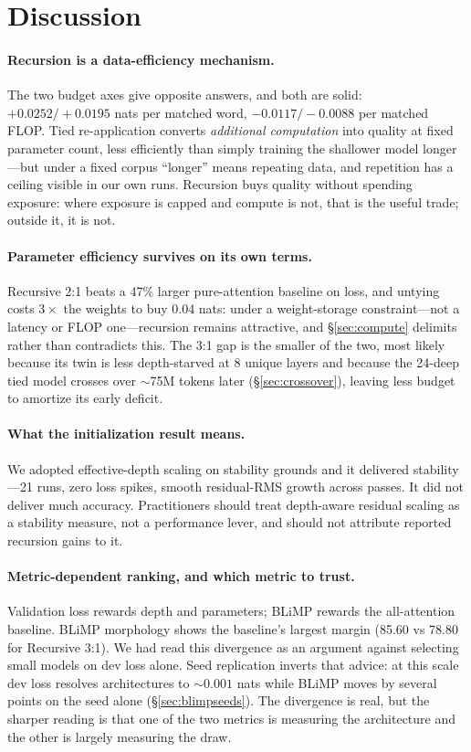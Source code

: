 \documentclass[11pt]{article}
\begin{document}
\section{Discussion}

\paragraph{Recursion is a data-efficiency mechanism.} The two budget axes give opposite answers, and both are solid: $+0.0252/+0.0195$ nats per matched word, $-0.0117/-0.0088$ per matched FLOP. Tied re-application converts \emph{additional computation} into quality at fixed parameter count, less efficiently than simply training the shallower model longer---but under a fixed corpus ``longer'' means repeating data, and repetition has a ceiling visible in our own runs. Recursion buys quality without spending exposure: where exposure is capped and compute is not, that is the useful trade; outside it, it is not.

\paragraph{Parameter efficiency survives on its own terms.} Recursive 2:1 beats a 47\% larger pure-attention baseline on loss, and untying costs $3\times$ the weights to buy 0.04 nats: under a weight-storage constraint---not a latency or FLOP one---recursion remains attractive, and \S\ref{sec:compute} delimits rather than contradicts this. The 3:1 gap is the smaller of the two, most likely because its twin is less depth-starved at 8 unique layers and because the 24-deep tied model crosses over ${\sim}$75M tokens later (\S\ref{sec:crossover}), leaving less budget to amortize its early deficit.

\paragraph{What the initialization result means.} We adopted effective-depth scaling on stability grounds and it delivered stability---21 runs, zero loss spikes, smooth residual-RMS growth across passes. It did not deliver much accuracy. Practitioners should treat depth-aware residual scaling as a stability measure, not a performance lever, and should not attribute reported recursion gains to it.

\paragraph{Metric-dependent ranking, and which metric to trust.} Validation loss rewards depth and parameters; BLiMP rewards the all-attention baseline. BLiMP morphology shows the baseline's largest margin (85.60 vs 78.80 for Recursive 3:1). We had read this divergence as an argument against selecting small models on dev loss alone. Seed replication inverts that advice: at this scale dev loss resolves architectures to ${\sim}0.001$ nats while BLiMP moves by several points on the seed alone (\S\ref{sec:blimpseeds}). The divergence is real, but the sharper reading is that one of the two metrics is measuring the architecture and the other is largely measuring the draw.
\end{document}
